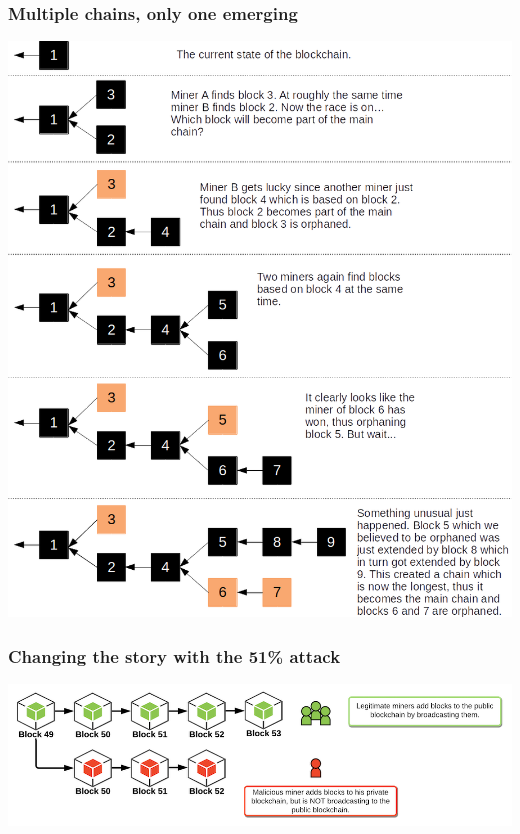 \documentclass[11pt]{beamer}  %
\begin{document}
\begin{frame}\frametitle{Multiple chains, only one emerging}

  \begin{center}
    \includegraphics[scale=0.29,clip=false]{pictures/chains.png}
  \end{center}

\end{frame}

\begin{frame}\frametitle{Changing the story with the 51\% attack}

  \begin{center}
    \includegraphics[width=\textwidth,clip=false]{pictures/51-a.png}
  \end{center}

\end{frame}
\end{document}
